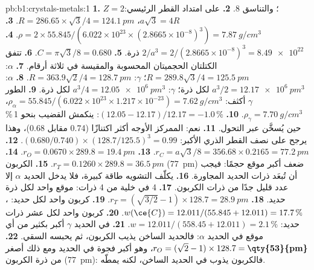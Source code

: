 \begin{solution}{pb:b1:crystals-metals:1}
\textbf{1.} $Z = 2$؛ والتناسق 8.
\textbf{2.} على امتداد القطر الرئيسي: $a\sqrt3 = 4R$، $R = 286.65 \times
\sqrt3/4 = \qty{124.1}{pm}$.
\textbf{3.} $\rho = 2 \times 55.845/(6.022 \times 10^{23} \times (2.8665
\times 10^{-8})^3) = \qty{7.87}{g/cm^3}$.
\textbf{4.} $2/a^3 = 2/(2.8665 \times 10^{-8})^3 = \num{8.49e22}$ ذرة.
\textbf{5.} $C = \pi\sqrt3/8 = 0.680$.
\textbf{6.} تتفق الكتلتان الحجميتان المحسوبة والمقيسة في ثلاثة أرقام.
\textbf{7.} $\alpha$: $R = 289.8\sqrt3/4 = \qty{125.5}{pm}$؛ $\gamma$:
$R = 363.9\sqrt2/4 = \qty{128.7}{pm}$.
\textbf{8.} $\alpha$: $a^3/2 = \qty{12.17e6}{pm^3}$ لكل ذرة؛ $\gamma$:
$a^3/4 = \qty{12.05e6}{pm^3}$ لكل ذرة.
\textbf{9.} الطور $\gamma$ أكثف: $\rho_\alpha = 55.845/(6.022 \times 10^{23}
\times 1.217 \times 10^{-23}) = \qty{7.62}{g/cm^3}$، $\rho_\gamma =
\qty{7.70}{g/cm^3}$.
\textbf{10.} $(12.05 - 12.17)/12.17 = -1.0\,\%$: ينكمش القضيب بنحو
1\,\% حين يُسخَّن عبر التحول.
\textbf{11.} نعم: الممركز الأوجه أكثر اكتنازًا (0.74 مقابل 0.68)، وهذا يرجح على
نصف القطر الذري الأكبر: $(0.680/0.740) \times (128.7/125.5)^3 = 0.99$.
\textbf{12.} $r_C = a\sqrt3/8 = 356.68 \times 0.2165 = \qty{77.2}{pm}$.
\textbf{13.} $r_O = 0.0670 \times 289.8 = \qty{19.4}{pm}$.
\textbf{14.} $r_T = 0.1260 \times 289.8 = \qty{36.5}{pm}$.
\textbf{15.} الكربون (\qty{77}{pm}) ضعف أكبر موقع حجمًا:
فيجب أن تُبعَد ذرات الحديد المجاورة.
\textbf{16.} يكلّف التشويه طاقة كبيرة، فلا يدخل الحديد $\alpha$ إلا
عدد قليل جدًا من ذرات الكربون.
\textbf{17.} 4  في خلية من 4 ذرات: موقع واحد لكل ذرة حديد.
\textbf{18.} $r_T = (\sqrt{3/2} - 1) \times 128.7 = \qty{28.9}{pm}$.
\textbf{19.} كربون واحد لكل حديد: ، $w(\ce{C}) = 12.011/(55.845 +
12.011) = 17.7\,\%$.
\textbf{20.} كربون واحد لكل عشر ذرات حديد: $w = 12.011/(558.45 + 12.011) =
2.1\,\%$.
\textbf{21.}  في الحديد $\gamma$ أكبر بكثير من
أي موقع في الحديد $\alpha$: فالحديد الساخن يذيب الكربون، ثم يحبسه
السقي.
\textbf{22.} $r_O = (\sqrt2 - 1) \times 128.7 = \textbf{\qty{53}{pm}}$، وهو
أكبر فجوة في الحديد ومع ذلك أصغر من ذرة الكربون (\qty{77}{pm}):
فالكربون يذوب في الحديد الساخن، لكنه يمطّه.
\end{solution}
